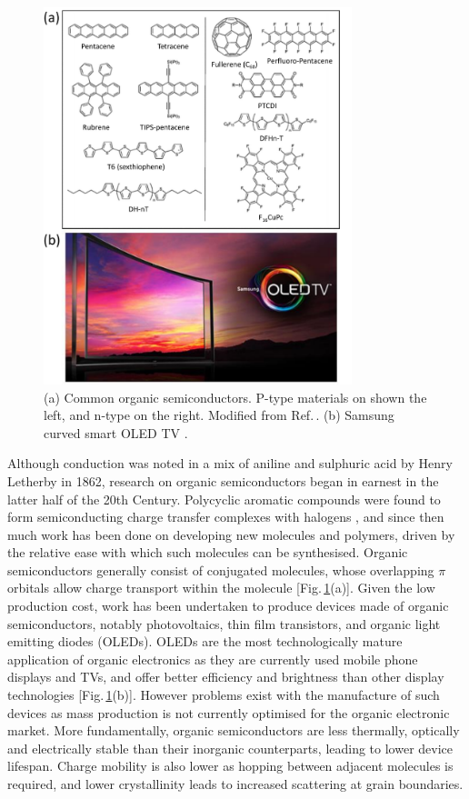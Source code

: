 \begin{figure}[h!]
\centering
\includegraphics[width=0.8\textwidth]{Fig2}
\caption{(a) Common organic semiconductors. P-type materials on shown the left, and n-type on the right. Modified from Ref.\,\cite{Miozzo2010}. (b) Samsung curved smart OLED TV \cite{Samsung}.}
\label{1Fig2}
\end{figure}
Although conduction was noted in a mix of aniline and sulphuric acid by Henry Letherby in 1862, research on organic semiconductors began in earnest in the latter half of the 20th Century. Polycyclic aromatic compounds were found to form semiconducting charge transfer complexes with halogens \cite{Naarmann2002}, and since then much work has been done on developing new molecules and polymers, driven by the relative ease with which such molecules can be synthesised. Organic semiconductors generally consist of conjugated molecules, whose overlapping $\pi$ orbitals allow charge transport within the molecule [Fig.\,\ref{1Fig2}(a)]. Given the low production cost, work has been undertaken to produce devices made of organic semiconductors, notably photovoltaics, thin film transistors, and organic light emitting diodes (OLEDs). OLEDs are the most technologically mature application of organic electronics as they are currently used mobile phone displays and TVs, and offer better efficiency and brightness than other display technologies [Fig.\,\ref{1Fig2}(b)]. However problems exist with the manufacture of such devices as mass production is not currently optimised for the organic electronic market. More fundamentally, organic semiconductors are less thermally, optically and electrically stable than their inorganic counterparts, leading to lower device lifespan. Charge mobility is also lower as hopping between adjacent molecules is required, and lower crystallinity leads to increased scattering at grain boundaries. 

